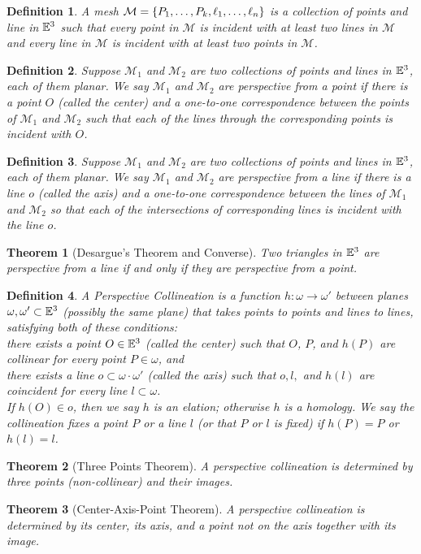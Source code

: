 \documentclass[12pt]{amsart}
\newtheorem*{theorem}{Theorem}
\newtheorem*{definition}{Definition}
\theoremstyle{remark}
\newtheorem*{basic notion}{Basic Notion}
\newcommand{\EE}{{\ensuremath\mathbb E}}
\begin{document}
\begin{definition}
A \emph{mesh} $\mathcal{M}=\{P_1,\mathellipsis,P_k,\ell_1,\mathellipsis,\ell_n \}$ is a collection of points and line in $\EE^3$ such that every point in $\mathcal{M}$ is incident with at least two lines in $\mathcal{M}$ and every line in $\mathcal{M}$ is incident with at least two points in $\mathcal{M}$.
\end{definition}

\begin{definition}
Suppose $\mathcal{M}_1$ and $\mathcal{M}_2$ are two collections of points and lines in $\EE^3$, each of them planar. We say $\mathcal{M}_1$ and $\mathcal{M}_2$ are perspective from a point if there is a point $O$ (called the center) and a one-to-one correspondence between the points of $\mathcal{M}_1$ and $\mathcal{M}_2$ such that each of the lines through the corresponding points is incident with $O$.
\end{definition}

\begin{definition}
Suppose $\mathcal{M}_1$ and $\mathcal{M}_2$ are two collections of points and lines in $\EE^3$, each of them planar. We say $\mathcal{M}_1$ and $\mathcal{M}_2$ are perspective from a line if there is a line $o$ (called the axis) and a one-to-one correspondence between the lines of $\mathcal{M}_1$ and $\mathcal{M}_2$ so that each of the intersections of corresponding lines is incident with the line $o$. 
\end{definition}

\begin{theorem}[Desargue's Theorem and Converse] Two triangles in $\EE^3$ are perspective from a line if and only if they are perspective from a point.
\end{theorem}

\begin{definition}
A Perspective Collineation is a function $h: \omega \to \omega'$ between planes $\omega, \omega' \subset \EE^3$ (possibly the same plane) that takes points to points and lines to lines, satisfying both of these conditions:\\
\indent there exists a point $O \in \EE^3$ (called the center) such that $O$, $P$, and $h(P)$ are collinear for every point $P \in \omega$, and\\
\indent there exists a line $o \subset \omega \cdot \omega'$ (called the axis) such that $o, l,$ and $h(l)$ are coincident for every line $l \subset \omega$.\\
If $h(O) \in o$, then we say $h$ is an elation; otherwise $h$ is a homology. We say the collineation fixes a point $P$ or a line $l$ (or that $P$ or $l$ is fixed) if $h(P)=P$ or $h(l)=l$.
\end{definition}

\begin{theorem}[Three Points Theorem] A perspective collineation is determined by three points (non-collinear) and their images.
\end{theorem}

\begin{theorem}[Center-Axis-Point Theorem]A perspective collineation is determined by its center, its axis, and a point not on the axis together with its image. 
\end{theorem}
\end{document}
